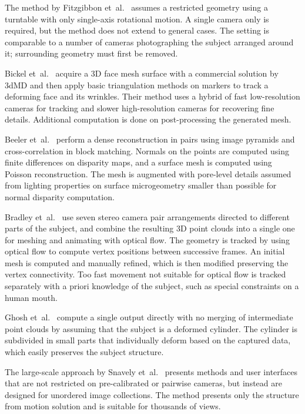 The method by Fitzgibbon et~al.~\cite{fitzgibbon1998automatic} assumes a restricted geometry using a turntable with only single-axis rotational motion.
A single camera only is required, but the method does not extend to general cases.
The setting is comparable to a number of cameras photographing the subject arranged around it; surrounding geometry must first be removed.

Bickel et~al.~\cite{bickel2007multi} acquire a 3D face mesh surface with a commercial solution by 3dMD \cite{3dmd} and then apply basic triangulation methods on markers to track a deforming face and its wrinkles.
Their method uses a hybrid of fast low-resolution cameras for tracking and slower high-resolution cameras for recovering fine details.
Additional computation is done on post-processing the generated mesh.

Beeler et~al.~\cite{beeler2010high} perform a dense reconstruction in pairs using image pyramids and cross-correlation in block matching.
Normals on the points are computed using finite differences on disparity maps, and a surface mesh is computed using Poisson reconstruction.
The mesh is augmented with pore-level details assumed from lighting properties on surface microgeometry smaller than possible for normal disparity computation.

Bradley et~al.~\cite{bradley2010high} use seven stereo camera pair arrangements directed to different parts of the subject, and combine the resulting 3D point clouds into a single one for meshing and animating with optical flow.
The geometry is tracked by using optical flow to compute vertex positions between successive frames.
An initial mesh is computed and manually refined, which is then modified preserving the vertex connectivity.
Too fast movement not suitable for optical flow is tracked separately with a priori knowledge of the subject, such as special constraints on a human mouth.

Ghosh et~al.~\cite{ghosh2011multiview} compute a single output directly with no merging of intermediate point clouds by assuming that the subject is a deformed cylinder.
The cylinder is subdivided in small parts that individually deform based on the captured data, which easily preserves the subject structure.

The large-scale approach by Snavely et~al.~\cite{snavely2006photo} presents methods and user interfaces that are not restricted on pre-calibrated or pairwise cameras, but instead are designed for unordered image collections.
The method presents only the structure from motion solution and is suitable for thousands of views.

